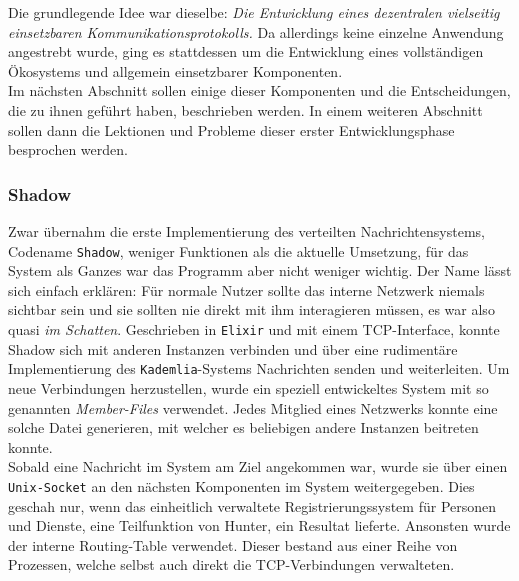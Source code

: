 \documentclass[11pt]{article}
\begin{document}
\noindent Die grundlegende Idee war dieselbe: \emph{Die Entwicklung eines
dezentralen vielseitig einsetzbaren Kommunikationsprotokolls.} Da
allerdings keine einzelne Anwendung angestrebt wurde, ging es
stattdessen um die Entwicklung eines vollständigen Ökosystems und
allgemein einsetzbarer Komponenten.\\

\noindent Im nächsten Abschnitt sollen einige dieser Komponenten und
die Entscheidungen, die zu ihnen geführt haben, beschrieben werden. In
einem weiteren Abschnitt sollen dann die Lektionen und Probleme dieser
erster Entwicklungsphase besprochen werden.
\subsubsection{Shadow}
\label{sec:org9a3ec04}
Zwar übernahm die erste Implementierung des verteilten
Nachrichtensystems, Codename \texttt{Shadow}, weniger Funktionen als die
aktuelle Umsetzung, für das System als Ganzes war das Programm aber
nicht weniger wichtig. Der Name lässt sich einfach erklären: Für
normale Nutzer sollte das interne Netzwerk niemals sichtbar sein und
sie sollten nie direkt mit ihm interagieren müssen, es war also quasi
\emph{im Schatten}. Geschrieben in \texttt{Elixir} und mit einem TCP-Interface, konnte
Shadow sich mit anderen Instanzen verbinden und über eine rudimentäre
Implementierung des \texttt{Kademlia}-Systems Nachrichten senden und
weiterleiten. Um neue Verbindungen herzustellen, wurde ein speziell
entwickeltes System mit so genannten \emph{Member-Files} verwendet. Jedes
Mitglied eines Netzwerks konnte eine solche Datei generieren, mit
welcher es beliebigen andere Instanzen beitreten konnte.\\

\noindent Sobald eine Nachricht im System am Ziel angekommen war,
wurde sie über einen \texttt{Unix-Socket} an den nächsten Komponenten im System
weitergegeben. Dies geschah nur, wenn das einheitlich verwaltete
Registrierungssystem für Personen und Dienste, eine Teilfunktion von
Hunter, ein Resultat lieferte. Ansonsten wurde der interne
Routing-Table verwendet. Dieser bestand aus einer Reihe von Prozessen,
welche selbst auch direkt die TCP-Verbindungen verwalteten.
\end{document}
